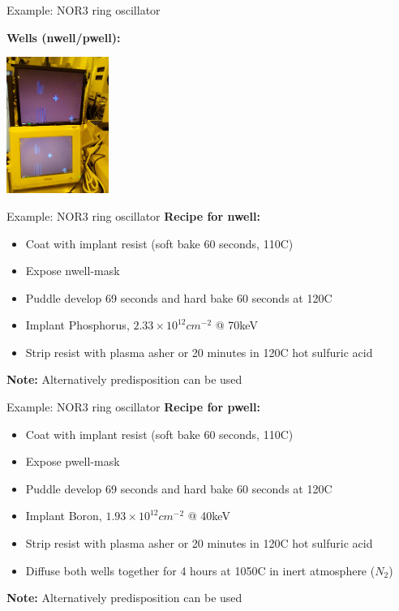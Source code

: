 \documentclass[aspectratio=169]{beamer}
\begin{document}
\begin{frame}{Example: NOR3 ring oscillator}
\begin{center}
	\textbf{Wells (nwell/pwell):}

	\includegraphics[width=0.25\textwidth]{images/20181214_125705.jpg}
\end{center}
\end{frame}

\begin{frame}{Example: NOR3 ring oscillator}
	\textbf{Recipe for nwell:}
	\begin{itemize}
		\item Coat with implant resist (soft bake 60 seconds, 110\textdegree{}C)
		\item Expose nwell-mask
		\item Puddle develop 69 seconds and hard bake 60 seconds at 120\textdegree{}C
		\item Implant Phosphorus, $2.33 \times 10^{12} cm^{-2}$ @ 70keV
		\item Strip resist with plasma asher or 20 minutes in 120\textdegree{}C hot sulfuric acid
	\end{itemize}
	\textbf{Note:} Alternatively predisposition can be used
\end{frame}

\begin{frame}{Example: NOR3 ring oscillator}
	\textbf{Recipe for pwell:}
	\begin{itemize}
		\item Coat with implant resist (soft bake 60 seconds, 110\textdegree{}C)
		\item Expose pwell-mask
		\item Puddle develop 69 seconds and hard bake 60 seconds at 120\textdegree{}C
		\item Implant Boron, $1.93 \times 10^{12} cm^{-2}$ @ 40keV
		\item Strip resist with plasma asher or 20 minutes in 120\textdegree{}C hot sulfuric acid
		\item Diffuse both wells together for 4 hours at 1050\textdegree{}C in inert atmosphere ($N_2$) 
	\end{itemize}
	\textbf{Note:} Alternatively predisposition can be used
\end{frame}
\end{document}
